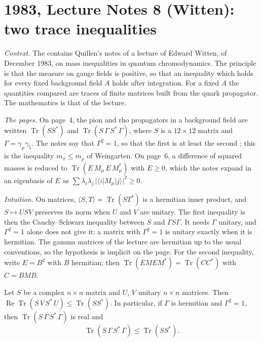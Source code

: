 \section[1983, Lecture Notes 8 (Witten): two trace inequalities]{1983, Lecture Notes 8 (Witten): two trace inequalities\protect{}}\label{sec:quillen-1983-ln8}

\emph{Context.} The  contains Quillen's notes of a lecture of Edward Witten, of December 1983, on mass inequalities in quantum chromodynamics. The principle is that the measure on gauge fields is positive, so that an inequality which holds for every fixed background field $A$ holds after integration. For a fixed $A$ the quantities compared are traces of finite matrices built from the quark propagator. The mathematics is that of the lecture.

\emph{The pages.} On page~4, the pion and rho propagators in a background field are written $\operatorname{Tr}(SS^*)$ and $\operatorname{Tr}(S\,\Gamma\,S^*\,\Gamma)$, where $S$ is a $12 \times 12$ matrix and $\Gamma = \gamma_\mu\gamma_5$. The notes say that $\Gamma^2 = 1$, so that the first is at least the second ; this is the inequality $m_\pi \le m_\rho$ of Weingarten. On page~6, a difference of squared masses is reduced to $\operatorname{Tr}(E\,M_\mu\,E\,M_\mu^*)$ with $E \ge 0$, which the notes expand in an eigenbasis of $E$ as $\sum \lambda_i\lambda_j\,|\langle i|M_\mu|j\rangle|^2 \ge 0$.

\emph{Intuition.} On matrices, $\langle S, T\rangle = \operatorname{Tr}(ST^*)$ is a hermitian inner product, and $S \mapsto USV$ preserves its norm when $U$ and $V$ are unitary. The first inequality is then the Cauchy--Schwarz inequality between $S$ and $\Gamma S\Gamma$. It needs $\Gamma$ unitary, and $\Gamma^2 = 1$ alone does not give it: a matrix with $\Gamma^2 = 1$ is unitary exactly when it is hermitian. The gamma matrices of the lecture are hermitian up to the usual conventions, so the hypothesis is implicit on the page. For the second inequality, write $E = B^2$ with $B$ hermitian; then $\operatorname{Tr}(EMEM^*) = \operatorname{Tr}(CC^*)$ with $C = BMB$.

\begin{encadre}
\begin{theoreme}\label{thm:quillen-1983-ln8-a}
Let $S$ be a complex $n \times n$ matrix and $U$, $V$ unitary $n \times n$ matrices. Then $\operatorname{Re}\operatorname{Tr}(S\,V\,S^*\,U) \le \operatorname{Tr}(SS^*)$. In particular, if $\Gamma$ is hermitian and $\Gamma^2 = 1$, then $\operatorname{Tr}(S\,\Gamma\,S^*\,\Gamma)$ is real and
\[
  \operatorname{Tr}(S\,\Gamma\,S^*\,\Gamma) \le \operatorname{Tr}(SS^*).
\]
\end{theoreme}
\end{encadre}

